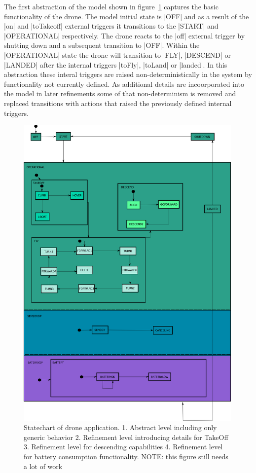 The first abstraction of the model shown in figure~\ref{fig:drone} captures the basic 
functionality of the drone. The model initial state is |OFF| and as a result of the |on| and 
|toTakeoff| external triggers it transitions to the |START| and |OPERATIONAL| respectively. 
The drone reacts to the |off| external trigger by shutting down and a subsequent transition to |OFF|.
Within the |OPERATIONAL| state the drone will transition to |FLY|, |DESCEND| or |LANDED| 
after the internal triggers |toFly|, |toLand| or |landed|. In this abstraction these interal 
triggers are raised non-deterministically in the system by functionality not currently defined.
As additional details are incoorporated into the model in later refinements some of that non-determinism is 
removed and replaced transitions with actions that raised the previously defined internal triggers.
\begin{figure}[!h]
	\vspace{-.4cm}
	\centering
	\includegraphics[width=0.99\textwidth]{figures/drone.png}
	\caption{Statechart of drone application. 1. Abstract level including only generic behavior 
	2. Refinement level introducing details for TakeOff 3. Refinement level for descending capabilities 
	4. Refinement level for battery consumption functionality. NOTE: this figure still needs a lot of work}
	\label{fig:drone}
	\vspace{-.4cm}
\end{figure} 
